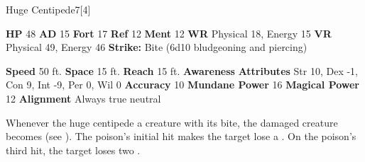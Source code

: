   \begin{monsubsection}{Huge Centipede}{7}[4]
    \vspace{-1em}\vspace{-1em}
    \vspace{0em}

    
    

    \begin{spellcontent}
      \begin{spelltargetinginfo}
        \pari \textbf{HP} 48 \monsep
          \textbf{AD} 15 \monsep
          \textbf{Fort} 17 \monsep
          \textbf{Ref} 12 \monsep
          \textbf{Ment} 12
        \pari \textbf{WR} Physical 18, Energy 15 \monsep
        \textbf{VR} Physical 49, Energy 46
        \pari \textbf{Strike:}
            Bite  (6d10 bludgeoning and piercing)
      \end{spelltargetinginfo}
    \end{spellcontent}
    \begin{monsterfooter}
      \pari \textbf{Speed} 50 ft. \monsep
        \textbf{Space} 15 ft. \monsep
        \textbf{Reach} 15 ft.
      \pari \textbf{Awareness} 
      \pari \textbf{Attributes}
        Str 10, Dex -1,
        Con 9, Int -9,
        Per 0, Wil 0
      \pari \textbf{Accuracy} 10 \monsep
        \textbf{Mundane Power} 16 \monsep
      \textbf{Magical Power} 12
      \pari \textbf{Alignment} Always true neutral
    \end{monsterfooter}
  \end{monsubsection}
        Whenever the huge centipede  a creature with its bite,
          the damaged creature becomes  (see ).
        The poison's initial hit makes the target lose a .
        On the poison's third hit, the target loses two .
  

